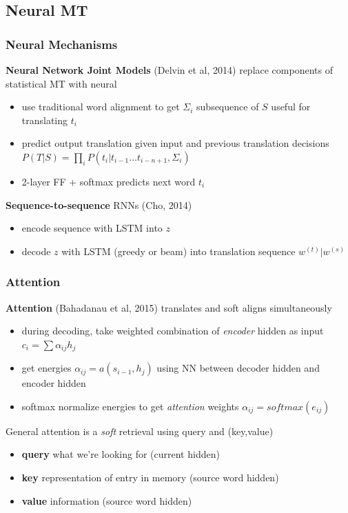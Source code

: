 \documentclass[]{article}
\theoremstyle{definition}
\begin{document}
\subsection{Neural MT}%
\label{sub:neural_machine_translation}

\subsubsection{Neural Mechanisms}%
\label{ssub:neural_mechanisms}

\textbf{Neural Network Joint Models} (Delvin et al, 2014) replace components of statistical MT with neural
\begin{itemize}
    \item use traditional word alignment to get $\Sigma_i$ subsequence of $S$ useful for translating $t_i$
    \item predict output translation given input and previous translation decisions $P(T|S) = \prod_i P(t_i | t_{i-1} \ldots t_{i-n+1},\Sigma_i)$
    \item 2-layer FF + softmax predicts next word $t_i$
\end{itemize}

\textbf{Sequence-to-sequence} RNNs (Cho, 2014)
\begin{itemize}
    \item encode sequence with LSTM into $z$
    \item decode $z$ with LSTM (greedy or beam) into translation sequence $w^(t) | w^(s)$
\end{itemize}

\subsubsection{Attention}%
\label{ssub:attention}


\textbf{Attention} (Bahadanau et al, 2015) translates and soft aligns simultaneously
\begin{itemize}
    \item during decoding, take weighted combination of \textit{encoder} hidden as input $c_i = \sum \alpha_{ij} h_j$
    \item get energies $\alpha_{ij} = a(s_{i-1},h_j)$ using NN between decoder hidden and encoder hidden
    \item softmax normalize energies to get \textit{attention} weights $\alpha_{ij} = softmax(e_{ij})$
\end{itemize}

General attention is a \textit{soft} retrieval using query and (key,value)
\begin{itemize}
    \item \textbf{query} what we're looking for (current hidden)
    \item \textbf{key} representation of entry in memory (source word hidden)
    \item \textbf{value} information (source word hidden)
\end{itemize}
\end{document}
